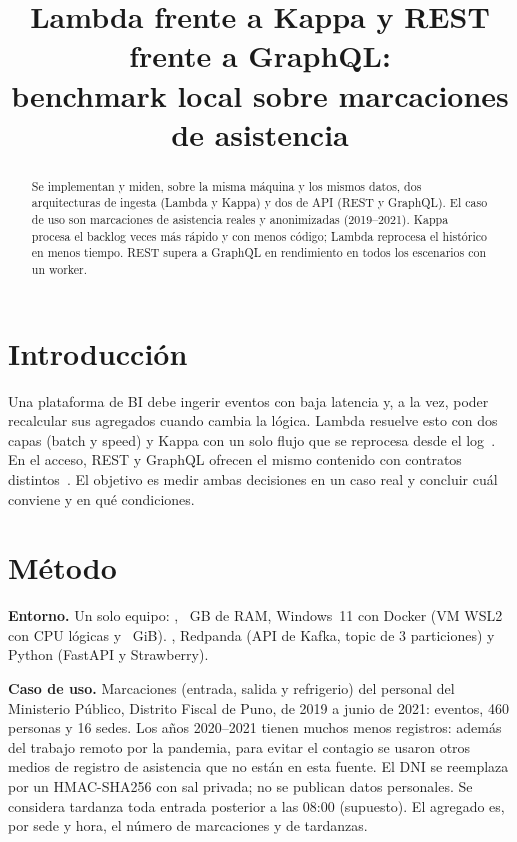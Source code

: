 \documentclass[conference,a4paper]{IEEEtran}
\begin{document}
\title{Lambda frente a Kappa y REST frente a GraphQL:\\ benchmark local sobre marcaciones de asistencia}
\author{
}
\maketitle

\begin{abstract}
Se implementan y miden, sobre la misma máquina y los mismos datos, dos arquitecturas de ingesta
(Lambda y Kappa) y dos de API (REST y GraphQL). El caso de uso son \NumEvents{} marcaciones de
asistencia reales y anonimizadas (2019--2021). Kappa procesa el backlog \NumTpRatio{} veces más rápido
y con menos código; Lambda reprocesa el histórico en menos tiempo. REST supera a GraphQL en
rendimiento en todos los escenarios con un worker.
\end{abstract}

\section{Introducción}
Una plataforma de BI debe ingerir eventos con baja latencia y, a la vez, poder recalcular sus
agregados cuando cambia la lógica. Lambda resuelve esto con dos capas (batch y speed) y Kappa con un
solo flujo que se reprocesa desde el log~\cite{lin2017}. En el acceso, REST y GraphQL ofrecen el mismo
contenido con contratos distintos~\cite{brito2019}. El objetivo es medir ambas decisiones en un caso
real y concluir cuál conviene y en qué condiciones.

\section{Método}
\textbf{Entorno.} Un solo equipo: \EnvCpu, \EnvRam{}~GB de RAM, Windows~11 con Docker \EnvDocker{}
(VM WSL2 con \EnvVmCpu{} CPU lógicas y \EnvVmRam{}~GiB). \EnvPostgres, Redpanda \EnvRedpanda{}
(API de Kafka, topic de 3 particiones) y Python \EnvPython{} (FastAPI y Strawberry).

\textbf{Caso de uso.} Marcaciones (entrada, salida y refrigerio) del personal del Ministerio Público,
Distrito Fiscal de Puno, de 2019 a junio de 2021: \NumEvents{} eventos, 460 personas y 16 sedes. Los
años 2020--2021 tienen muchos menos registros: además del trabajo remoto por la pandemia, para
evitar el contagio se usaron otros medios de registro de asistencia que no están en esta fuente. El DNI se reemplaza por un HMAC-SHA256 con
sal privada; no se publican datos personales. Se considera tardanza toda entrada posterior a las
08:00 (supuesto). El agregado es, por sede y hora, el número de marcaciones y de tardanzas.
\end{document}
